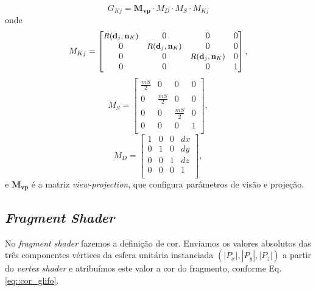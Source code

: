 \begin{equation}
    G_{Kj} = \mathbf{M_{vp}}\cdot M_D \cdot M_S \cdot M_{Kj}
\end{equation}
onde 
\begin{equation}
    M_{Kj} = \begin{bmatrix} 
   \mbox{\small $R( \mathbf{d}_j, \mathbf{n}_K)$} & 0 & 0 & 0 \\
    0 & \mbox{\small $R( \mathbf{d}_j, \mathbf{n}_K)$}  & 0 & 0 \\
    0 & 0 & \mbox{\small $R( \mathbf{d}_j, \mathbf{n}_K)$}  & 0 \\
    0 & 0 & 0 & 1 \\
\end{bmatrix},
\end{equation}
\begin{equation}
    M_{S} = \begin{bmatrix} 
    \frac{mS}{2} & 0             & 0            & 0 \\
    0            & \frac{mS}{2} & 0            & 0 \\
    0            & 0             & \frac{mS}{2} & 0 \\
    0            & 0             & 0            & 1 \\
\end{bmatrix},
\end{equation}
\begin{equation}
    M_{D} = \begin{bmatrix} 
    1 & 0 & 0 & dx \\
    0 & 1 & 0 & dy \\
    0 & 0 & 1 & dz \\
    0 & 0 & 0 & 1 \\
\end{bmatrix},
\end{equation}
e $\mathbf{M_{vp}}$ é a matriz \textit{view-projection}, que configura parâmetros de visão e projeção.

\subsection{\textit{Fragment Shader}}

No \textit{fragment shader} fazemos a definição de cor. Enviamos os valores absolutos das três componentes vértices da esfera unitária instanciada $(|P_x|, |P_y|, |P_z|)$ a partir do \textit{vertex shader} e atribuímos este valor a cor do fragmento, conforme Eq. \ref{eq::cor_glifo}.







